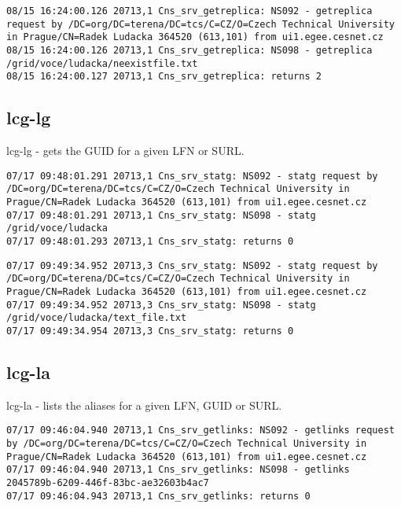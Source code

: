 \documentclass[a4paper, 11pt]{article} %
\begin{document}
\begin{lstlisting}[label={log:lr2},caption={lcg-lr lfn://grid/voce/ludacka/neexistfile.txt - query on file that does not exist}]
08/15 16:24:00.126 20713,1 Cns_srv_getreplica: NS092 - getreplica request by /DC=org/DC=terena/DC=tcs/C=CZ/O=Czech Technical University in Prague/CN=Radek Ludacka 364520 (613,101) from ui1.egee.cesnet.cz
08/15 16:24:00.126 20713,1 Cns_srv_getreplica: NS098 - getreplica /grid/voce/ludacka/neexistfile.txt
08/15 16:24:00.127 20713,1 Cns_srv_getreplica: returns 2
\end{lstlisting}

\newpage

\subsection{lcg-lg}

lcg-lg - gets the GUID for a given LFN or SURL.

\begin{lstlisting}[label={log:lg1},caption={lcg-lg --vo voce lfn:/grid/voce/ludacka}]
07/17 09:48:01.291 20713,1 Cns_srv_statg: NS092 - statg request by /DC=org/DC=terena/DC=tcs/C=CZ/O=Czech Technical University in Prague/CN=Radek Ludacka 364520 (613,101) from ui1.egee.cesnet.cz
07/17 09:48:01.291 20713,1 Cns_srv_statg: NS098 - statg /grid/voce/ludacka 
07/17 09:48:01.293 20713,1 Cns_srv_statg: returns 0
\end{lstlisting}

\begin{lstlisting}[label={log:lg2},caption={lcg-lg --vo voce lfn:/grid/voce/ludacka/text\_file.txt}]
07/17 09:49:34.952 20713,3 Cns_srv_statg: NS092 - statg request by /DC=org/DC=terena/DC=tcs/C=CZ/O=Czech Technical University in Prague/CN=Radek Ludacka 364520 (613,101) from ui1.egee.cesnet.cz
07/17 09:49:34.952 20713,3 Cns_srv_statg: NS098 - statg /grid/voce/ludacka/text_file.txt 
07/17 09:49:34.954 20713,3 Cns_srv_statg: returns 0
\end{lstlisting}

\subsection{lcg-la}

lcg-la - lists the aliases for a given LFN, GUID or SURL.

\begin{lstlisting}[label={log:la1},caption={lcg-la --vo voce guid:2045789b-6209-446f-83bc-ae32603b4ac7}]
07/17 09:46:04.940 20713,1 Cns_srv_getlinks: NS092 - getlinks request by /DC=org/DC=terena/DC=tcs/C=CZ/O=Czech Technical University in Prague/CN=Radek Ludacka 364520 (613,101) from ui1.egee.cesnet.cz
07/17 09:46:04.940 20713,1 Cns_srv_getlinks: NS098 - getlinks  2045789b-6209-446f-83bc-ae32603b4ac7
07/17 09:46:04.943 20713,1 Cns_srv_getlinks: returns 0
\end{lstlisting}
\end{document}
